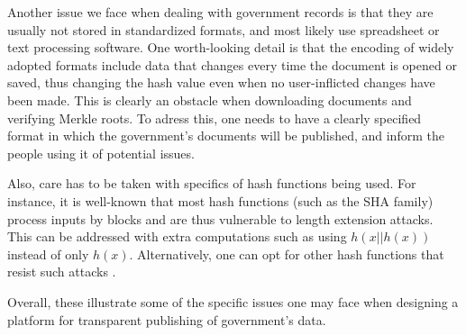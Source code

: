 Another issue we face when dealing with government records is that they are usually not stored in standardized formats, and most likely use spreadsheet or text processing software. One worth-looking detail is that the encoding of widely adopted formats include data that changes every time the document is opened or saved, thus changing the hash value even when no user-inflicted changes have been made. This is clearly an obstacle when downloading documents and verifying Merkle roots. To adress this, one needs to have a clearly specified format in which the government's documents will be published, and inform the people using it of potential issues. %

Also, care has to be taken with specifics of hash functions being used. For instance, it is well-known that most hash functions (such as the SHA family) process inputs by blocks and are thus vulnerable to length extension attacks. This can be addressed with extra computations such as using $h(x||h(x))$ instead of only $h(x)$. Alternatively, one can opt for other hash functions that resist such attacks \cite{keccak}.

Overall, these illustrate some of the specific issues one may face when designing a platform for transparent publishing of government's data. 


